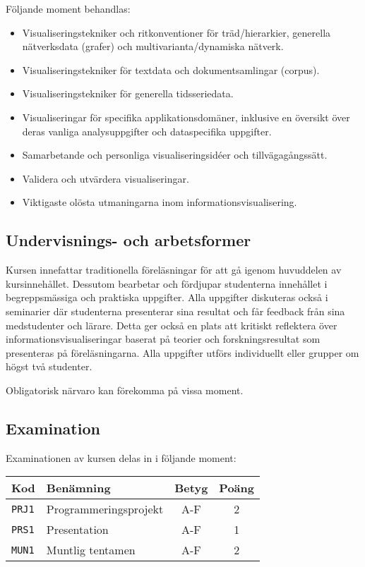 Följande moment behandlas:

\begin{itemize}
\tightlist
\item
  Visualiseringstekniker och ritkonventioner för träd/hierarkier,
  generella nätverksdata (grafer) och multivarianta/dynamiska nätverk.
\item
  Visualiseringstekniker för textdata och dokumentsamlingar (corpus).
\item
  Visualiseringstekniker för generella tidsseriedata.
\item
  Visualiseringar för specifika applikationsdomäner, inklusive en
  översikt över deras vanliga analysuppgifter och dataspecifika
  uppgifter.
\item
  Samarbetande och personliga visualiseringsidéer och tillvägagångssätt.
\item
  Validera och utvärdera visualiseringar.
\item
  Viktigaste olösta utmaningarna inom informationsvisualisering.
\end{itemize}

\subsection*{Undervisnings- och
arbetsformer}

Kursen innefattar traditionella föreläsningar för att gå igenom
huvuddelen av kursinnehållet. Dessutom bearbetar och fördjupar
studenterna innehållet i begreppsmässiga och praktiska uppgifter. Alla
uppgifter diskuteras också i seminarier där studenterna presenterar sina
resultat och får feedback från sina medstudenter och lärare. Detta ger
också en plats att kritiskt reflektera över informationsvisualiseringar
baserat på teorier och forskningsresultat som presenteras på
föreläsningarna. Alla uppgifter utförs individuellt eller grupper om
högst två studenter.

Obligatorisk närvaro kan förekomma på vissa moment.

\subsection*{Examination}

Examinationen av kursen delas in i följande moment:

\begin{longtable}[]{@{}llcc@{}}
\toprule
\textsf{Kod} & \textsf{Benämning} & \textsf{Betyg} & \textsf{Poäng}\tabularnewline
\midrule
\endhead
\texttt{PRJ1} & Programmeringsprojekt & A-F & 2\tabularnewline
\texttt{PRS1} & Presentation & A-F & 1\tabularnewline
\texttt{MUN1} & Muntlig tentamen & A-F & 2\tabularnewline
\bottomrule
\end{longtable}

